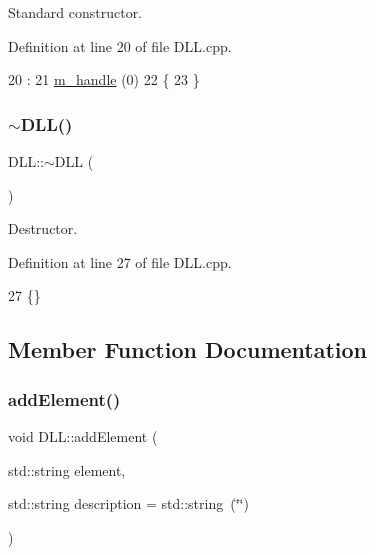 Standard constructor. 



Definition at line 20 of file D\+L\+L.\+cpp.


\begin{DoxyCode}
20           :
21 \hyperlink{classDLL_a2ca22015aef35c5d61f8daaf3c070154}{m\_handle} (0)
22 \{
23 \}
\end{DoxyCode}
\mbox{\label{classDLL_aff5b45d4b57b97144d4b49bc05aa0ddd}} 
\subsubsection{\texorpdfstring{$\sim$\+D\+L\+L()}{~DLL()}}
{\footnotesize\ttfamily D\+L\+L\+::$\sim$\+D\+LL (\begin{DoxyParamCaption}{ }\end{DoxyParamCaption})\hspace{0.3cm}{\ttfamily [virtual]}}



Destructor. 



Definition at line 27 of file D\+L\+L.\+cpp.


\begin{DoxyCode}
27 \{\}
\end{DoxyCode}


\subsection{Member Function Documentation}
\mbox{\label{classDLL_ac6528d0e965139d0830868fe8cace775}} 
\subsubsection{\texorpdfstring{add\+Element()}{addElement()}}
{\footnotesize\ttfamily void D\+L\+L\+::add\+Element (\begin{DoxyParamCaption}\item[{std\+::string}]{element,  }\item[{std\+::string}]{description = {\ttfamily std\+:\+:string~(\char`\"{}\char`\"{})} }\end{DoxyParamCaption})\hspace{0.3cm}{\ttfamily [inline]}}

